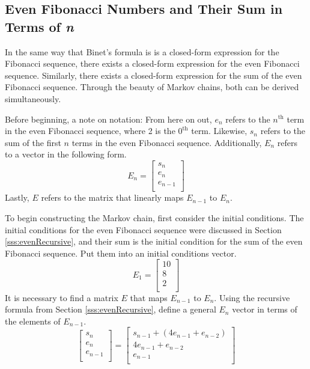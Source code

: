 \documentclass[titlepage]{article}
\begin{document}
\subsection{Even Fibonacci Numbers and Their Sum in Terms of \emph{n}}
In the same way that Binet's formula is is a closed-form expression for the Fibonacci sequence, there exists a closed-form expression for the even Fibonacci sequence. Similarly, there exists a closed-form expression for the sum of the even Fibonacci sequence. Through the beauty of Markov chains, both can be derived simultaneously.\par
Before beginning, a note on notation: From here on out, $e_n$ refers to the $n^\text{th}$ term in the even Fibonacci sequence, where 2 is the $0^\text{th}$ term. Likewise, $s_n$ refers to the sum of the first $n$ terms in the even Fibonacci sequence. Additionally, $E_n$ refers to a vector in the following form.
\begin{equation*}
    E_n =
    \begin{bmatrix}
        s_n\\
        e_n\\
        e_{n-1}\\
    \end{bmatrix}
\end{equation*}
Lastly, $E$ refers to the matrix that linearly maps $E_{n-1}$ to $E_n$.\par
To begin constructing the Markov chain, first consider the initial conditions. The initial conditions for the even Fibonacci sequence were discussed in Section \ref{sss:evenRecursive}, and their sum is the initial condition for the sum of the even Fibonacci sequence. Put them into an initial conditions vector.
\begin{equation*}
    E_1 =
    \begin{bmatrix}
        10\\
        8\\
        2\\
    \end{bmatrix}
\end{equation*}
It is necessary to find a matrix $E$ that maps $E_{n-1}$ to $E_n$. Using the recursive formula from Section \ref{sss:evenRecursive}, define a general $E_n$ vector in terms of the elements of $E_{n-1}$.
\begin{equation*}
    \begin{bmatrix}
        s_n\\
        e_n\\
        e_{n-1}\\
    \end{bmatrix}
    =
    \begin{bmatrix}
        s_{n-1}+(4e_{n-1}+e_{n-2})\\
        4e_{n-1}+e_{n-2}\\
        e_{n-1}\\
    \end{bmatrix}
\end{equation*}
\end{document}

